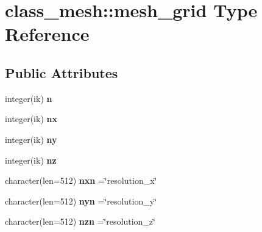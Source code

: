 \hypertarget{structclass__mesh_1_1mesh__grid}{\section{class\-\_\-mesh\-:\-:mesh\-\_\-grid Type Reference}
\label{structclass__mesh_1_1mesh__grid}
}
\subsection*{Public Attributes}
\begin{DoxyCompactItemize}
\item 
\hypertarget{structclass__mesh_1_1mesh__grid_a6e61080a7b1d9826fc345dc0f2e3c948}{integer(ik) {\bfseries n}}\label{structclass__mesh_1_1mesh__grid_a6e61080a7b1d9826fc345dc0f2e3c948}

\item 
\hypertarget{structclass__mesh_1_1mesh__grid_a9d96d502db35f7da58bf8b788e7dd256}{integer(ik) {\bfseries nx}}\label{structclass__mesh_1_1mesh__grid_a9d96d502db35f7da58bf8b788e7dd256}

\item 
\hypertarget{structclass__mesh_1_1mesh__grid_abb6fd4fce167d69d2d8637a2fa8c7a27}{integer(ik) {\bfseries ny}}\label{structclass__mesh_1_1mesh__grid_abb6fd4fce167d69d2d8637a2fa8c7a27}

\item 
\hypertarget{structclass__mesh_1_1mesh__grid_abdb55640a6aacf340136cccae5f2de35}{integer(ik) {\bfseries nz}}\label{structclass__mesh_1_1mesh__grid_abdb55640a6aacf340136cccae5f2de35}

\item 
\hypertarget{structclass__mesh_1_1mesh__grid_a716d5bc62b771451a0538c952c0386c6}{character(len=512) {\bfseries nxn} =\char`\"{}resolution\-\_\-x\char`\"{}}\label{structclass__mesh_1_1mesh__grid_a716d5bc62b771451a0538c952c0386c6}

\item 
\hypertarget{structclass__mesh_1_1mesh__grid_ab4050a08c107c7854fa4caddead6b5de}{character(len=512) {\bfseries nyn} =\char`\"{}resolution\-\_\-y\char`\"{}}\label{structclass__mesh_1_1mesh__grid_ab4050a08c107c7854fa4caddead6b5de}

\item 
\hypertarget{structclass__mesh_1_1mesh__grid_a99b9efdba2e81ff2fbf1cb7bcb2c7324}{character(len=512) {\bfseries nzn} =\char`\"{}resolution\-\_\-z\char`\"{}}\label{structclass__mesh_1_1mesh__grid_a99b9efdba2e81ff2fbf1cb7bcb2c7324}


\end{DoxyCompactItemize}
